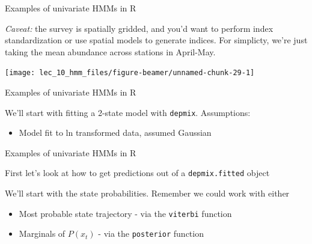 \documentclass[
  ignorenonframetext,
]{beamer}
\newenvironment{Shaded}{\begin{snugshade}}{\end{snugshade}}
\newcommand{\DataTypeTok}[1]{\textcolor[rgb]{0.13,0.29,0.53}{#1}}
\newcommand{\DecValTok}[1]{\textcolor[rgb]{0.00,0.00,0.81}{#1}}
\newcommand{\KeywordTok}[1]{\textcolor[rgb]{0.13,0.29,0.53}{\textbf{#1}}}
\newcommand{\NormalTok}[1]{#1}
\newcommand{\OperatorTok}[1]{\textcolor[rgb]{0.81,0.36,0.00}{\textbf{#1}}}
\newcommand{\StringTok}[1]{\textcolor[rgb]{0.31,0.60,0.02}{#1}}
\providecommand{\tightlist}{%
  \setlength{\itemsep}{0pt}\setlength{\parskip}{0pt}}
\begin{document}
\begin{frame}{Examples of univariate HMMs in R}
\protect\hypertarget{examples-of-univariate-hmms-in-r-16}{}

\emph{Caveat:} the survey is spatially gridded, and you'd want to
perform index standardization or use spatial models to generate indices.
For simplicty, we're just taking the mean abundance across stations in
April-May.

\begin{center}\texttt{[image: lec\_10\_hmm\_files/figure-beamer/unnamed-chunk-29-1]} \end{center}

\end{frame}

\begin{frame}[fragile]{Examples of univariate HMMs in R}
\protect\hypertarget{examples-of-univariate-hmms-in-r-17}{}

We'll start with fitting a 2-state model with \texttt{depmix}.
Assumptions:

\begin{itemize}
\tightlist
\item
  Model fit to ln transformed data, assumed Gaussian
\end{itemize}

\begin{Shaded}
\end{Shaded}

\end{frame}

\begin{frame}[fragile]{Examples of univariate HMMs in R}
\protect\hypertarget{examples-of-univariate-hmms-in-r-18}{}

First let's look at how to get predictions out of a
\texttt{depmix.fitted} object

We'll start with the state probabilities. Remember we could work with
either

\begin{itemize}
\tightlist
\item
  Most probable state trajectory - via the \texttt{viterbi} function
\item
  Marginals of \(P(x_{t})\) - via the \texttt{posterior} function
\end{itemize}

\end{frame}
\end{document}
